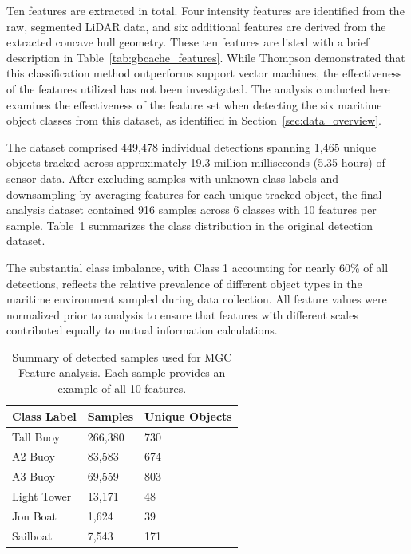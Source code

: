 \documentclass{erauthesis}
\begin{document}
Ten features are extracted in total.  
Four intensity features are identified from the raw, segmented LiDAR data, and six additional features are derived from the extracted concave hull geometry.
These ten features are listed with a brief description in Table~\ref{tab:gbcache_features}.
While Thompson \cite{thompson2017} demonstrated that this classification method outperforms support vector machines, the effectiveness of the features utilized has not been investigated.
The analysis conducted here examines the effectiveness of the feature set when detecting the six maritime object classes from this dataset, as identified in Section~\ref{sec:data_overview}.

The dataset comprised 449,478 individual detections spanning 1,465 unique objects tracked across approximately 19.3 million milliseconds (5.35 hours) of sensor data. 
After excluding samples with unknown class labels and downsampling by averaging features for each unique tracked object, the final analysis dataset contained 916 samples across 6 classes with 10 features per sample. 
Table~\ref{tbl:class_distribution} summarizes the class distribution in the original detection dataset.

The substantial class imbalance, with Class 1 accounting for nearly 60\% of all detections, reflects the relative prevalence of different object types in the maritime environment sampled during data collection. 
All feature values were normalized prior to analysis to ensure that features with different scales contributed equally to mutual information calculations.

\begin{table}[htbp]
\centering
\begin{tabular}{lll}
\hline
Class Label & Samples & Unique Objects \\
\hline
\hline
Tall Buoy   & 266,380     & 730           \\
A2 Buoy     & 83,583      & 674           \\
A3 Buoy     & 69,559      & 803           \\
Light Tower & 13,171      & 48            \\
Jon Boat    & 1,624       & 39            \\
Sailboat    & 7,543       & 171           \\      
\hline
\end{tabular}
\caption{Summary of detected samples used for MGC Feature analysis. Each sample provides an example of all 10 features.}
\label{tbl:class_distribution}
\end{table}
\end{document}
